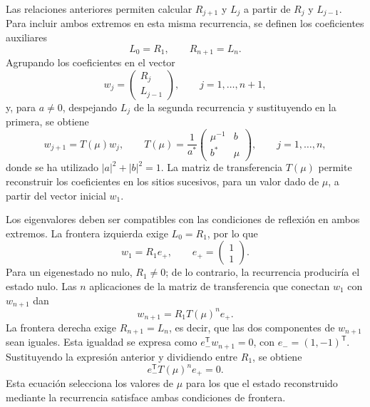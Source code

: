 \documentclass[12pt,a4paper,oneside]{report} %
\begin{document}
Las relaciones anteriores permiten calcular $R_{j+1}$ y $L_j$ a partir de $R_j$ y $L_{j-1}$. Para incluir ambos extremos en esta misma recurrencia, se definen los coeficientes auxiliares
\begin{equation}
  L_0=R_1,
  \qquad
  R_{n+1}=L_n.
  \label{eq:amplitudes-auxiliares-1d}
\end{equation}
Agrupando los coeficientes en el vector
\begin{equation}
  w_j=
  \begin{pmatrix}
    R_j\\L_{j-1}
  \end{pmatrix},
  \qquad j=1,\ldots,n+1,
\end{equation}
y, para $a\neq0$, despejando $L_j$ de la segunda recurrencia y sustituyendo en la primera, se obtiene
\begin{equation}
  w_{j+1}=T(\mu)w_j,
  \qquad
  T(\mu)=\frac{1}{a^*}
  \begin{pmatrix}
    \mu^{-1}&b\\
    b^*&\mu
  \end{pmatrix},
  \qquad j=1,\ldots,n,
  \label{eq:matriz-transferencia-1d}
\end{equation}
donde se ha utilizado $|a|^2+|b|^2=1$. La matriz de transferencia $T(\mu)$ permite reconstruir los coeficientes en los sitios sucesivos, para un valor dado de $\mu$, a partir del vector inicial $w_1$.

Los eigenvalores deben ser compatibles con las condiciones de reflexión en ambos extremos. La frontera izquierda exige $L_0=R_1$, por lo que
\begin{equation}
  w_1=R_1e_+,
  \qquad
  e_+=
  \begin{pmatrix}
    1\\1
  \end{pmatrix}.
\end{equation}
Para un eigenestado no nulo, $R_1\neq0$; de lo contrario, la recurrencia produciría el estado nulo. Las $n$ aplicaciones de la matriz de transferencia que conectan $w_1$ con $w_{n+1}$ dan
\begin{equation}
  w_{n+1}=R_1T(\mu)^ne_+.
  \label{eq:transferencia-tramo-completo}
\end{equation}
La frontera derecha exige $R_{n+1}=L_n$, es decir, que las dos componentes de $w_{n+1}$ sean iguales. Esta igualdad se expresa como $e_-^{\mathsf T}w_{n+1}=0$, con $e_-=(1,-1)^{\mathsf T}$. Sustituyendo la expresión anterior y dividiendo entre $R_1$, se obtiene
\begin{equation}
  e_-^{\mathsf T}T(\mu)^ne_+=0.
  \label{eq:condicion-eigenvalores-1d}
\end{equation}
Esta ecuación selecciona los valores de $\mu$ para los que el estado reconstruido mediante la recurrencia satisface ambas condiciones de frontera.
\end{document}
